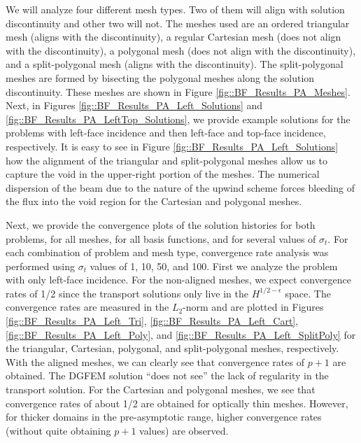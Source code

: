 We will analyze four different mesh types. Two of them will align with solution discontinuity and other two will not. The meshes used are an ordered triangular mesh (aligns with the discontinuity), a regular Cartesian mesh (does not align with the discontinuity), a polygonal mesh (does not align with the discontinuity), and a split-polygonal mesh (aligns with the discontinuity). The split-polygonal meshes are formed by bisecting the polygonal meshes along the solution discontinuity. These meshes are shown in Figure \ref{fig::BF_Results_PA_Meshes}. Next, in Figures \ref{fig::BF_Results_PA_Left_Solutions} and \ref{fig::BF_Results_PA_LeftTop_Solutions}, we provide example solutions for the problems with left-face incidence and then left-face and top-face incidence, respectively. It is easy to see in Figure \ref{fig::BF_Results_PA_Left_Solutions} how the alignment of the triangular and split-polygonal meshes allow us to capture the void in the upper-right portion of the meshes. The numerical dispersion of the beam due to the nature of the upwind scheme forces bleeding of the flux into the void region for the Cartesian and polygonal meshes.

Next, we provide the convergence plots of the solution histories for both problems, for all meshes, for all basis functions, and for several values of $\sigma_t$. For each combination of problem and mesh type, convergence rate analysis was performed using $\sigma_t$ values of 1, 10, 50, and 100. First we analyze the problem with only left-face incidence. For the non-aligned meshes, we expect convergence rates of 1/2 since the transport solutions only live in the $H^{1/2-\epsilon}$ space. The convergence rates are measured in the $L_2$-norm and are plotted in Figures \ref{fig::BF_Results_PA_Left_Tri}, \ref{fig::BF_Results_PA_Left_Cart}, \ref{fig::BF_Results_PA_Left_Poly}, and \ref{fig::BF_Results_PA_Left_SplitPoly} for the triangular, Cartesian, polygonal, and split-polygonal meshes, respectively. With the aligned meshes, we can clearly see that convergence rates of $p+1$ are obtained. The DGFEM solution ``does not see'' the lack of regularity in the transport solution. For the Cartesian and polygonal meshes, we see that convergence rates of about 1/2 are obtained for optically thin meshes. However, for thicker domains in the pre-asymptotic range, higher convergence rates (without quite obtaining $p+1$ values) are observed.

